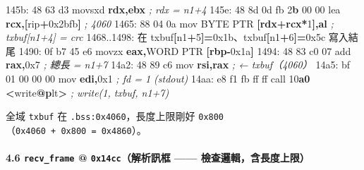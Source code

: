 \documentclass[10pt,a4paper]{article}
\newenvironment{Shaded}{\begin{snugshade}}{\end{snugshade}}
\newcommand{\BaseNTok}[1]{\textcolor[rgb]{0.00,0.00,0.81}{#1}}
\newcommand{\BuiltInTok}[1]{#1}
\newcommand{\CommentTok}[1]{\textcolor[rgb]{0.56,0.35,0.01}{\textit{#1}}}
\newcommand{\DataTypeTok}[1]{\textcolor[rgb]{0.13,0.29,0.53}{#1}}
\newcommand{\DecValTok}[1]{\textcolor[rgb]{0.00,0.00,0.81}{#1}}
\newcommand{\ErrorTok}[1]{\textcolor[rgb]{0.64,0.00,0.00}{\textbf{#1}}}
\newcommand{\FunctionTok}[1]{\textcolor[rgb]{0.13,0.29,0.53}{\textbf{#1}}}
\newcommand{\KeywordTok}[1]{\textcolor[rgb]{0.13,0.29,0.53}{\textbf{#1}}}
\newcommand{\NormalTok}[1]{#1}
\newcommand{\OperatorTok}[1]{\textcolor[rgb]{0.81,0.36,0.00}{\textbf{#1}}}
\renewenvironment{Shaded}{%
  \def\FrameCommand{\fboxsep=3.2pt\colorbox{shadecolor}}%
  \MakeFramed{\advance\hsize-\width\FrameRestore\small}%
}{%
  \endMakeFramed
}
\renewenvironment{quote}{%
  \begin{mdframed}[linewidth=0pt,innerleftmargin=0pt,innerrightmargin=0pt,
    innerbottommargin=0pt,innertopmargin=0pt,skipabove=0.55em,skipbelow=0.55em,
    leftmargin=0.9em,rightmargin=0.4em,startcode={\color{quotebar}\vrule width 2.6pt},%
    endcode={}]%
  \itshape\color{black}%
}{%
  \end{mdframed}%
}
\begin{document}
\begin{Shaded}
\begin{Highlighting}[]
\NormalTok{145b: 48 63 d3               movsxd }\KeywordTok{rdx}\OperatorTok{,}\KeywordTok{ebx}               \CommentTok{; rdx = n1+4}
\NormalTok{145e: 48 8d 0d fb }\DecValTok{2}\ErrorTok{b} \DecValTok{00} \DecValTok{00}\NormalTok{   lea    }\KeywordTok{rcx}\OperatorTok{,[}\NormalTok{rip}\OperatorTok{+}\BaseNTok{0x2bfb}\OperatorTok{]}     \CommentTok{; 4060}
\NormalTok{1465: 88 04 0a               }\BuiltInTok{mov}    \DataTypeTok{BYTE} \DataTypeTok{PTR} \OperatorTok{[}\KeywordTok{rdx}\OperatorTok{+}\KeywordTok{rcx}\OperatorTok{*}\DecValTok{1}\OperatorTok{],}\KeywordTok{al} \CommentTok{; txbuf[n1+4] = crc}
\NormalTok{1468..1498: 在 txbuf}\OperatorTok{[}\NormalTok{n1}\OperatorTok{+}\DecValTok{5}\OperatorTok{]=}\BaseNTok{0x1b}\NormalTok{、txbuf}\OperatorTok{[}\NormalTok{n1}\OperatorTok{+}\DecValTok{6}\OperatorTok{]=}\BaseNTok{0x5c}\NormalTok{ 寫入結尾}
\NormalTok{1490: 0f b7 }\DecValTok{45}\NormalTok{ e6            movzx  }\KeywordTok{eax}\OperatorTok{,}\DataTypeTok{WORD} \DataTypeTok{PTR} \OperatorTok{[}\KeywordTok{rbp}\OperatorTok{{-}}\BaseNTok{0x1a}\OperatorTok{]}
\NormalTok{1494: 48 83 c0 }\DecValTok{07}\NormalTok{            add    }\KeywordTok{rax}\OperatorTok{,}\BaseNTok{0x7}               \CommentTok{; 總長 = n1+7}
\NormalTok{14a2: 48 89 c6               mov    }\KeywordTok{rsi}\OperatorTok{,}\KeywordTok{rax}               \CommentTok{; ← txbuf（4060）}
\NormalTok{14a5: bf }\DecValTok{01} \DecValTok{00} \DecValTok{00} \DecValTok{00}\NormalTok{         mov    }\KeywordTok{edi}\OperatorTok{,}\BaseNTok{0x1}               \CommentTok{; fd = 1 (stdout)}
\NormalTok{14aa: e8 f1 fb ff ff         call   }\DecValTok{10}\ErrorTok{a0} \OperatorTok{\textless{}}\NormalTok{write}\FunctionTok{@}\ErrorTok{p}\NormalTok{lt}\OperatorTok{\textgreater{}}      \CommentTok{; write(1, txbuf, n1+7)}
\end{Highlighting}
\end{Shaded}

\begin{quote}
全域 \texttt{txbuf} 在 \texttt{.\allowbreak{}bss:\allowbreak{}0x4060}，長度上限剛好
\texttt{0x800}（\texttt{0x4060\ \allowbreak{}+\ \allowbreak{}0x800\ \allowbreak{}=\ \allowbreak{}0x4860}）。
\end{quote}

\paragraph{\texorpdfstring{4.6 \texttt{recv\_\allowbreak{}frame} @
\texttt{0x14cc}（解析訊框 ------
檢查邏輯，含長度上限）}{4.6 recv\_frame @ 0x14cc（解析訊框 ------ 檢查邏輯，含長度上限）}}\label{recv_frame-0x14ccux89e3ux6790ux8a0aux6846-ux6aa2ux67e5ux908fux8f2fux542bux9577ux5ea6ux4e0aux9650}
\end{document}
